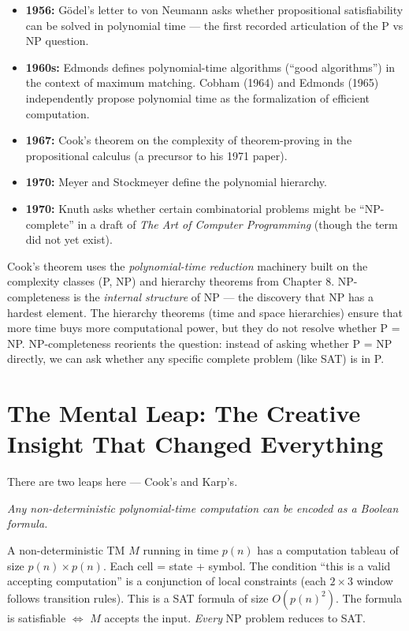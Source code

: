 \begin{itemize}
\item \textbf{1956:} G\"odel's letter to von Neumann asks whether propositional satisfiability can be solved in polynomial time — the first recorded articulation of the P vs NP question.
\item \textbf{1960s:} Edmonds defines polynomial-time algorithms (``good algorithms'') in the context of maximum matching. Cobham (1964) and Edmonds (1965) independently propose polynomial time as the formalization of efficient computation.
\item \textbf{1967:} Cook's theorem on the complexity of theorem-proving in the propositional calculus (a precursor to his 1971 paper). 
\item \textbf{1970:} Meyer and Stockmeyer define the polynomial hierarchy.
\item \textbf{1970:} Knuth asks whether certain combinatorial problems might be ``NP-complete'' in a draft of \emph{The Art of Computer Programming} (though the term did not yet exist).
\end{itemize}

Cook's theorem uses the \emph{polynomial-time reduction} machinery built on the complexity classes (P, NP) and hierarchy theorems from Chapter 8. NP-completeness is the \emph{internal structure} of NP — the discovery that NP has a hardest element. The hierarchy theorems (time and space hierarchies) ensure that more time buys more computational power, but they do not resolve whether P = NP. NP-completeness reorients the question: instead of asking whether P = NP directly, we can ask whether any specific complete problem (like SAT) is in P.

\section{The Mental Leap: The Creative Insight That Changed Everything}
\label{sec:np:leap}

There are two leaps here — Cook's and Karp's.

\emph{Any non-deterministic polynomial-time computation can be encoded as a Boolean formula.}

A non-deterministic TM $M$ running in time $p(n)$ has a computation tableau of size $p(n) \times p(n)$. Each cell = state + symbol. The condition ``this is a valid accepting computation'' is a conjunction of local constraints (each $2 \times 3$ window follows transition rules). This is a SAT formula of size $O(p(n)^2)$. The formula is satisfiable $\iff$ $M$ accepts the input. \emph{Every} NP problem reduces to SAT.


